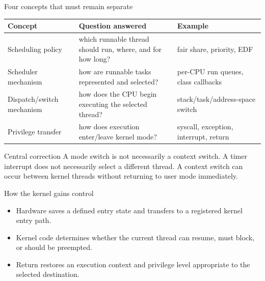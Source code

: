 \documentclass[aspectratio=169,11pt]{beamer}
\begin{document}
\begin{frame}{Four concepts that must remain separate}
  \small
  \begin{tabularx}{\textwidth}{@{}lXX@{}}
    \toprule
    \textbf{Concept} & \textbf{Question answered} & \textbf{Example} \\
    \midrule
    Scheduling policy & which runnable thread should run, where, and for how long? & fair share, priority, EDF \\
    Scheduler mechanism & how are runnable tasks represented and selected? & per-CPU run queues, class callbacks \\
    Dispatch/switch mechanism & how does the CPU begin executing the selected thread? & stack/task/address-space switch \\
    Privilege transfer & how does execution enter/leave kernel mode? & syscall, exception, interrupt, return \\
    \bottomrule
  \end{tabularx}
  \begin{alertblock}{Central correction}
    A mode switch is not necessarily a context switch. A timer interrupt does not necessarily select a different thread. A context switch can occur between kernel threads without returning to user mode immediately.
  \end{alertblock}
\end{frame}

\begin{frame}{How the kernel gains control}
  \centering
  \begin{itemize}
    \item Hardware saves a defined entry state and transfers to a registered kernel entry path.
    \item Kernel code determines whether the current thread can resume, must block, or should be preempted.
    \item Return restores an execution context and privilege level appropriate to the selected destination.
  \end{itemize}
\end{frame}
\end{document}
